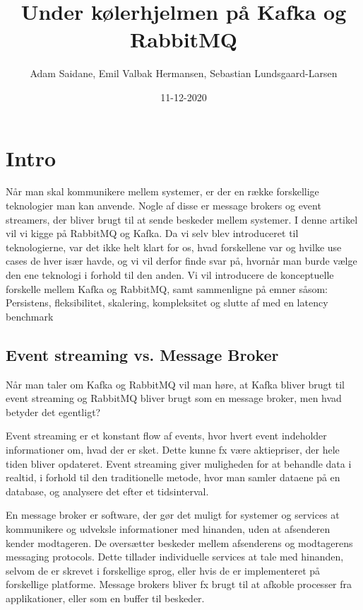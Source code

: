 \documentclass[
]{article}
\title{Under kølerhjelmen på Kafka og RabbitMQ}
\author{Adam Saidane, Emil Valbak Hermansen, Sebastian Lundsgaard-Larsen}
\date{11-12-2020}
\begin{document}
\maketitle

\hypertarget{intro}{%
\section{Intro}\label{intro}}

Når man skal kommunikere mellem systemer, er der en række forskellige
teknologier man kan anvende. Nogle af disse er message brokers og event
streamers, der bliver brugt til at sende beskeder mellem systemer. I
denne artikel vil vi kigge på RabbitMQ og Kafka. Da vi selv blev
introduceret til teknologierne, var det ikke helt klart for os, hvad
forskellene var og hvilke use cases de hver især havde, og vi vil derfor
finde svar på, hvornår man burde vælge den ene teknologi i forhold til
den anden. Vi vil introducere de konceptuelle forskelle mellem Kafka og
RabbitMQ, samt sammenligne på emner såsom: Persistens, fleksibilitet,
skalering, kompleksitet og slutte af med en latency benchmark

\hypertarget{event-streaming-vs.-message-broker}{%
\subsection{Event streaming vs. Message
Broker}\label{event-streaming-vs.-message-broker}}

Når man taler om Kafka og RabbitMQ vil man høre, at Kafka bliver brugt
til event streaming og RabbitMQ bliver brugt som en message broker, men
hvad betyder det egentligt?


Event streaming er et konstant flow af events, hvor hvert event
indeholder informationer om, hvad der er sket. Dette kunne fx være
aktiepriser, der hele tiden bliver opdateret. Event streaming giver
muligheden for at behandle data i realtid, i forhold til den
traditionelle metode, hvor man samler dataene på en database, og
analysere det efter et tidsinterval.\cite{event-streaming}



En message broker er software, der gør det muligt for systemer og
services at kommunikere og udveksle informationer med hinanden, uden at
afsenderen kender modtageren. De oversætter beskeder mellem afsenderens
og modtagerens messaging protocols. Dette tillader individuelle services
at tale med hinanden, selvom de er skrevet i forskellige sprog, eller
hvis de er implementeret på forskellige platforme. Message brokers
bliver fx brugt til at afkoble processer fra applikationer, eller som en
buffer til beskeder.\cite{message-brokers}
\end{document}
